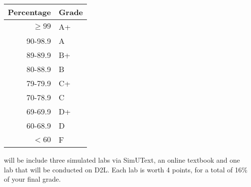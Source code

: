 \documentclass{tufte-handout}
\begin{document}
\begin{margintable}
\begin{tabular}{rl}
Percentage & Grade \\
\hline 
$\ge99$ & A+ \\
90-98.9 & A \\
89-89.9 & B+ \\
80-88.9 & B \\
79-79.9 & C+ \\
70-78.9 & C \\
69-69.9 & D+ \\
60-68.9 & D \\
$<60$ & F \\
\hline
\end{tabular}
\end{margintable}


 will be include three simulated labs via SimUText, an online textbook and one lab that will be conducted on D2L. Each lab is worth 4 points, for a total of 16\% of your final grade. 
\end{document}
